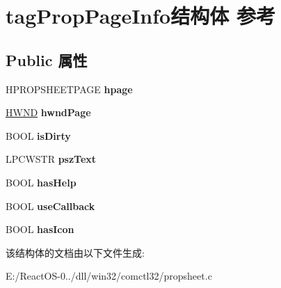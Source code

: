 \hypertarget{structtag_prop_page_info}{}\section{tag\+Prop\+Page\+Info结构体 参考}
\label{structtag_prop_page_info}
\subsection*{Public 属性}
\begin{DoxyCompactItemize}
\item 
\mbox{\label{structtag_prop_page_info_a55830d2705631eab8738cf28330cf0d9}} 
H\+P\+R\+O\+P\+S\+H\+E\+E\+T\+P\+A\+GE {\bfseries hpage}
\item 
\mbox{\label{structtag_prop_page_info_a7f0823afbff8163df95269208ad9a7cb}} 
\hyperlink{interfacevoid}{H\+W\+ND} {\bfseries hwnd\+Page}
\item 
\mbox{\label{structtag_prop_page_info_a26e3feb1d369bb013fd76496d0bc8ebe}} 
B\+O\+OL {\bfseries is\+Dirty}
\item 
\mbox{\label{structtag_prop_page_info_a283d127e6912fbd2150787924a5de356}} 
L\+P\+C\+W\+S\+TR {\bfseries psz\+Text}
\item 
\mbox{\label{structtag_prop_page_info_ab2a6a630f55cb7de1d5c785eae9da54f}} 
B\+O\+OL {\bfseries has\+Help}
\item 
\mbox{\label{structtag_prop_page_info_a84dc7e6217683ae604cbee38630298aa}} 
B\+O\+OL {\bfseries use\+Callback}
\item 
\mbox{\label{structtag_prop_page_info_a8d27e5031c5ae95d597cf9e4b2d123de}} 
B\+O\+OL {\bfseries has\+Icon}
\end{DoxyCompactItemize}


该结构体的文档由以下文件生成\+:\begin{DoxyCompactItemize}
\item 
E\+:/\+React\+O\+S-\/0../dll/win32/comctl32/propsheet.\+c\end{DoxyCompactItemize}
